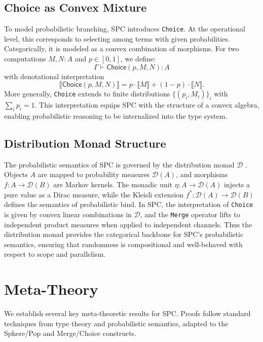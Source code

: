\documentclass{article}
\begin{document}
\subsection{Choice as Convex Mixture}

To model probabilistic branching, SPC introduces \texttt{Choice}. At the
operational level, this corresponds to selecting among terms with given
probabilities. Categorically, it is modeled as a convex combination of morphisms.
For two computations $M, N : A$ and $p \in [0,1]$, we define:
\[
  \Gamma \vdash \mathsf{Choice}(p, M, N) : A
\]
with denotational interpretation
\[
  \llbracket \mathsf{Choice}(p, M, N) \rrbracket
  = p \cdot \llbracket M \rrbracket + (1-p) \cdot \llbracket N \rrbracket.
\]
More generally, \texttt{Choice} extends to finite distributions
$\{(p_i, M_i)\}_{i}$ with $\sum_i p_i = 1$. This interpretation equips SPC with
the structure of a convex algebra, enabling probabilistic reasoning to be
internalized into the type system.

\subsection{Distribution Monad Structure}

The probabilistic semantics of SPC is governed by the distribution monad
$\mathcal{D}$ \cite{giry1982categorical}. Objects $A$ are mapped to probability
measures $\mathcal{D}(A)$, and morphisms $f : A \to \mathcal{D}(B)$ are Markov
kernels. The monadic unit $\eta : A \to \mathcal{D}(A)$ injects a pure value as
a Dirac measure, while the Kleisli extension $f^\ast : \mathcal{D}(A) \to
\mathcal{D}(B)$ defines the semantics of probabilistic bind. In SPC, the
interpretation of \texttt{Choice} is given by convex linear combinations in
$\mathcal{D}$, and the \texttt{Merge} operator lifts to independent product
measures when applied to independent channels. Thus the distribution monad
provides the categorical backbone for SPC’s probabilistic semantics, ensuring
that randomness is compositional and well-behaved with respect to scope and
parallelism.

\section{Meta-Theory}\label{sec:meta}

We establish several key meta-theoretic results for SPC. Proofs follow standard
techniques from type theory and probabilistic semantics, adapted to the
Sphere/Pop and Merge/Choice constructs.
\end{document}
